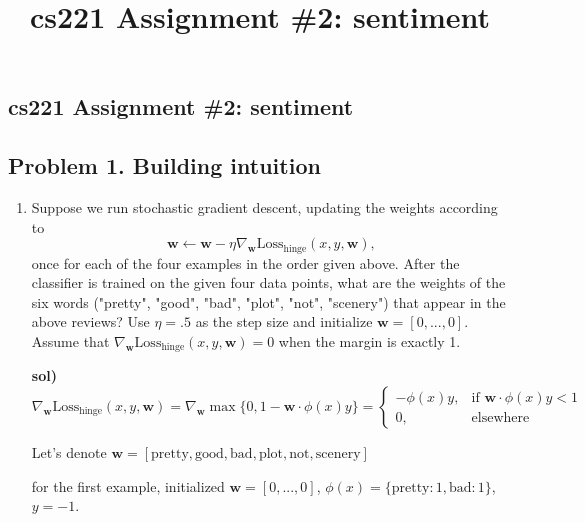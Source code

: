 \documentclass[a4paper]{article}
\title{cs221 Assignment \#2: sentiment}
\date{}
\author{}
\begin{document}
\begin{center}
    \section*{cs221 Assignment \#2: sentiment}
\end{center}
\medskip


\subsection*{Problem 1. Building intuition}
    \begin{enumerate}[label=\alph*.]

        \item Suppose we run stochastic gradient descent, updating the weights according to
        $$\mathbf{w} \leftarrow \mathbf{w} - \eta \nabla_\mathbf{w} \text{Loss}_{\text{hinge}}(x, y, \mathbf{w}),$$
        once for each of the four examples in the order given above.
        After the classifier is trained on the given four data points, what are the weights of the six words ("pretty", "good", "bad",
        "plot", "not", "scenery") that appear in the above reviews?  Use $\eta = .5$ as the step size and initialize $\mathbf{w} = [0, ..., 0]$.
        Assume that $\nabla_\mathbf{w} \text{Loss}_{\text{hinge}}(x, y, \mathbf{w}) = 0$ when the margin is exactly 1.

        \medskip \textbf{sol)} 
        \[
            \nabla_\mathbf{w} \text{Loss}_{\text{hinge}}(x, y, \mathbf{w}) = \nabla_\mathbf{w} \max \{0, 1 - \mathbf{w} \cdot \phi(x) y \} = \left.
            \begin{cases}
                - \phi(x) y , & \text{if } \mathbf{w} \cdot \phi(x) y  < 1 \\
                0, & \text{elsewhere} 
            \end{cases}
            \right.
        \]

        Let's denote $\textbf{w} = [\text{pretty}, \text{good}, \text{bad}, \text{plot}, \text{not}, \text{scenery}]$
        
        \medskip       
        
        for the first example, initialized $\mathbf{w} = [0, ..., 0] $, $\phi(x) = \{\text{pretty}:1, \text{bad}:1\}$, $y=-1$.
        

\end{enumerate}
\end{document}
